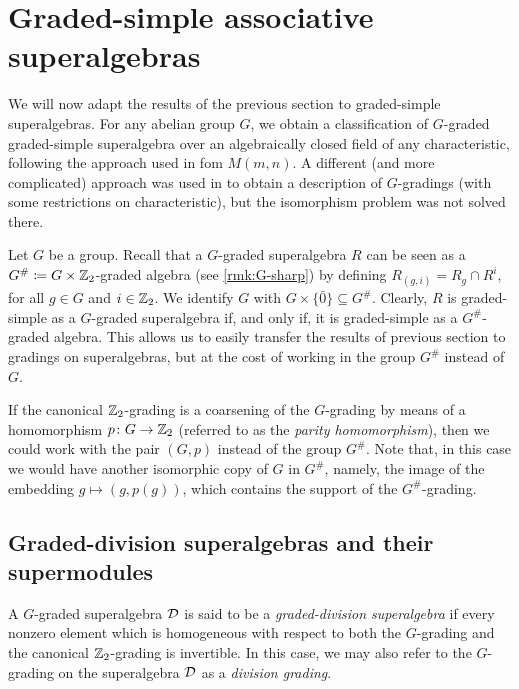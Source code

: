 \section{Graded-simple associative superalgebras}\label{sec:grd-simple-salg}

We will now adapt the results of the previous section to graded-simple superalgebras. 
For any abelian group $G$, we obtain a classification of $G$-graded graded-simple superalgebra over an algebraically closed field of any characteristic, following the approach used in \cite{paper-MAP} fom $M(m,n)$. 
A different (and more complicated) approach was used in \cite{BS} to obtain a description of $G$-gradings (with some restrictions on characteristic), but the isomorphism problem was not solved there. 

Let $G$ be a group. 
Recall that a $G$-graded superalgebra $R$ can be seen as a $G^\# \coloneqq G\times \mathbb{Z}_2$-graded algebra (see \cref{rmk:G-sharp}) by defining $R_{(g,i)} = R_g \cap R^i$, for all $g\in G$ and $i \in \mathbb{Z}_2$. 
We identify $G$ with $G \times \{ \bar 0 \} \subseteq G^\#$. 
Clearly, $R$ is graded-simple as a $G$-graded superalgebra if, and only if, it is graded-simple as a $G^\#$-graded algebra. 
This allows us to easily transfer the results of previous section to gradings on superalgebras, but at the cost of working in the group $G^\#$ instead of $G$. 

\begin{remark}
	If the canonical $\mathbb{Z}_2$-grading is a coarsening of the $G$-grading by means of a homomorphism $p\colon G\rightarrow \mathbb{Z}_2$ (referred to as the \emph{parity homomorphism}), then we could work with the pair $(G, p)$ instead of the group $G^\#$. 
	Note that, in this case we would have another isomorphic copy of $G$ in $G^\#$, namely, the image of the embedding $g\mapsto (g, p (g))$, which contains the support of the $G^\#$-grading. 
\end{remark}

\subsection{Graded-division superalgebras and their supermodules}\label{ssec:supermodules-over-D}

\begin{defi}
    A $G$-graded superalgebra $\mathcal{D}$ is said to be a \emph{graded-division superalgebra} if every nonzero element which is homogeneous with respect to both the $G$-grading and the canonical $\mathbb{Z}_2$-grading is invertible. 
    In this case, we may also refer to the $G$-grading on the superalgebra $\mathcal{D}$ as a \emph{division grading}.
\end{defi}

